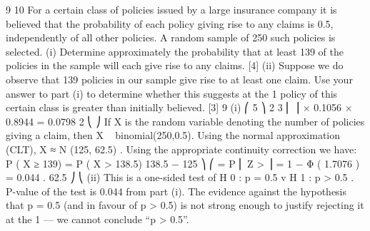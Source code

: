\documentclass[a4paper,12pt]{article}
\begin{document}
9
10
For a certain class of policies issued by a large insurance company it is believed that
the probability of each policy giving rise to any claims is 0.5, independently of all
other policies. A random sample of 250 such policies is selected.
(i) Determine approximately the probability that at least 139 of the policies in the
sample will each give rise to any claims.
[4]
(ii) Suppose we do observe that 139 policies in our sample give rise to at least one
claim. Use your answer to part (i) to determine whether this suggests at the
1%
policy of this certain class is greater than initially believed.
[3]
9
(i)
⎛ 5 ⎞
2
3
⎜ ⎟ × 0.1056 × 0.8944 = 0.0798
2
⎝ ⎠
If X is the random variable denoting the number of policies giving a claim,
then X ~ binomial(250,0.5).
Using the normal approximation (CLT), X ≈ N (125, 62.5) .
Using the appropriate continuity correction we have:
P ( X ≥ 139) = P ( X > 138.5)
138.5 − 125 ⎞
⎛
= P ⎜ Z >
⎟ = 1 − Φ ( 1.7076 ) = 0.044 .
62.5 ⎠
⎝
(ii)
This is a one-sided test of H 0 : p = 0.5 v H 1 : p > 0.5 .
P-value of the test is 0.044 from part (i).
The evidence against the hypothesis that p = 0.5 (and in favour of
p > 0.5) is not strong enough to justify rejecting it at the 1%
— we cannot conclude “p > 0.5”.
\end{document}
